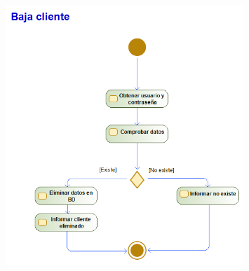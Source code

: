 \begin{figure}[H]
    \centering
    \includegraphics[width=0.8\textwidth]{Use_Cases/baja_cliente.png}
\end{figure}
\newpage
